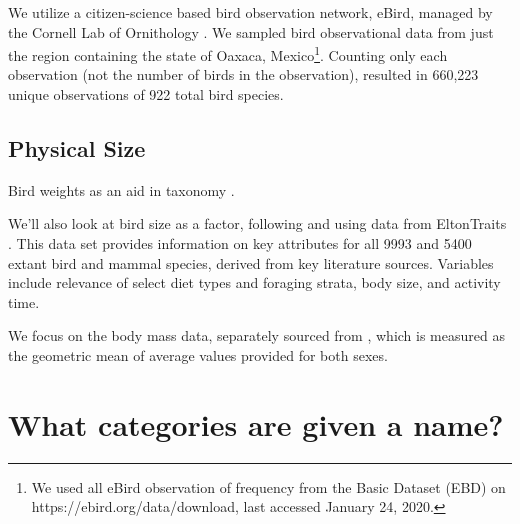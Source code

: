 \documentclass[10pt,letterpaper]{article}
\begin{document}
We utilize a citizen-science based bird observation network, eBird, managed by the Cornell Lab of Ornithology \cite{sullivan2009ebird}. We sampled bird observational data from just the region containing the state of Oaxaca, Mexico\footnote{We used all eBird observation of frequency from the Basic Dataset (EBD) on https://ebird.org/data/download, last accessed January 24, 2020.}. Counting only each observation (not the number of birds in the observation), resulted in 660,223 unique observations of 922 total bird species. 



\subsection{Physical Size}
Bird weights as an aid in taxonomy \cite{amadon1943bird}.

We'll also look at bird size as a factor, following \cite{hunn1999size} and using data from EltonTraits \cite{wilman2014eltontraits}.  This data set provides information on key attributes for all 9993 and 5400 extant bird and mammal species, derived from key literature sources. Variables include relevance of select diet types and foraging strata, body size, and activity time.

We focus on the body mass data, separately sourced from \cite{dunning2007crc}, which is measured as the geometric mean of average values provided for both sexes.




\section{What categories are given a name?}
\end{document}
